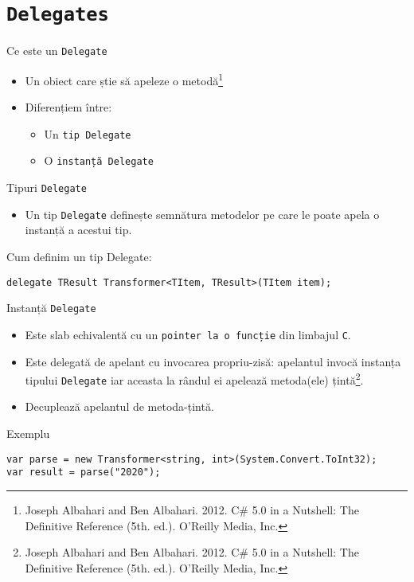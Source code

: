 \documentclass[presentation]{beamer}
\begin{document}
\section{\texttt{Delegates}}
\label{sec:org59e2a45}
\begin{frame}[label={sec:org59ade53},fragile]{Ce este un \texttt{Delegate}}
 \begin{itemize}
\item Un obiect care știe să apeleze o metodă\footnote{Joseph Albahari and Ben Albahari. 2012. C\# 5.0 in a Nutshell: The Definitive Reference (5th. ed.). O’Reilly Media, Inc.}
\item Diferențiem între:
\begin{itemize}
\item Un \texttt{tip Delegate}
\item O \texttt{instanță Delegate}
\end{itemize}
\end{itemize}
\end{frame}
\begin{frame}[label={sec:orgb27fd94},fragile]{Tipuri \texttt{Delegate}}
 \begin{itemize}
\item Un tip \texttt{Delegate} definește semnătura metodelor pe care le poate apela o instanță a acestui tip.
\end{itemize}
\begin{block}{Cum definim un tip Delegate:}
\begin{verbatim}
delegate TResult Transformer<TItem, TResult>(TItem item);
\end{verbatim}
\end{block}
\end{frame}
\begin{frame}[label={sec:org6d3752d},fragile]{Instanță \texttt{Delegate}}
 \begin{itemize}
\item Este \alert{slab echivalentă} cu un \texttt{pointer la o funcție} din limbajul \texttt{C}.
\item Este delegată de apelant cu invocarea propriu-zisă: apelantul invocă instanța tipului \texttt{Delegate} iar aceasta la rândul ei apelează metoda(ele) țintă\footnote{Joseph Albahari and Ben Albahari. 2012. C\# 5.0 in a Nutshell: The Definitive Reference (5th. ed.). O’Reilly Media, Inc.}.
\item Decuplează apelantul de metoda-țintă.
\end{itemize}
\begin{block}{Exemplu}
\begin{verbatim}
var parse = new Transformer<string, int>(System.Convert.ToInt32);
var result = parse("2020");
\end{verbatim}
\end{block}
\end{frame}
\end{document}
